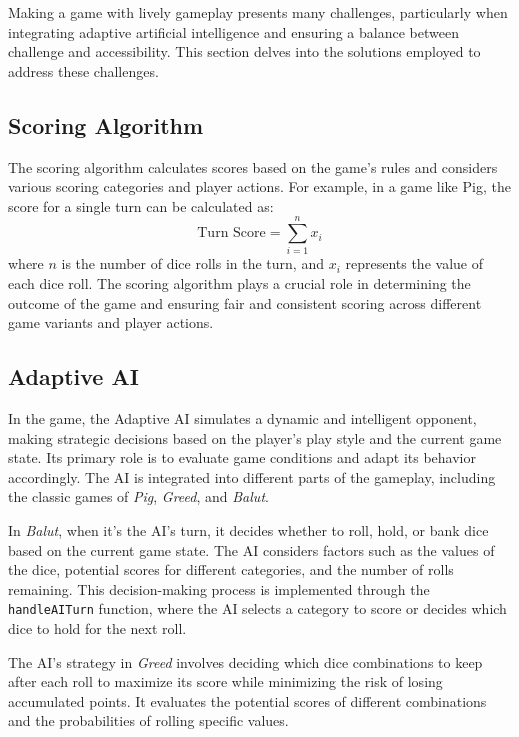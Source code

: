 Making a game with lively gameplay presents many challenges, particularly when integrating adaptive artificial intelligence and ensuring a balance between challenge and accessibility. This section delves into the solutions employed to address these challenges.

\subsection{Scoring Algorithm}

The scoring algorithm calculates scores based on the game's rules and considers various scoring categories and player actions. 
For example, in a game like Pig, the score for a single turn can be calculated as:
\begin{equation}
\text{Turn Score} = \sum_{i=1}^{n} x_i
\end{equation}
where $n$ is the number of dice rolls in the turn, and $x_i$ represents the value of each dice roll.
The scoring algorithm plays a crucial role in determining the outcome of the game and ensuring fair and consistent scoring across different game variants and player actions.

\subsection{Adaptive AI}
\label{subsec:adaptive_ai}

In the game, the Adaptive AI simulates a dynamic and intelligent opponent, making strategic decisions based on the player's play style and the current game state.  Its primary role is to evaluate game conditions and adapt its behavior accordingly. The AI is integrated into different parts of the gameplay, including the classic games of \emph{Pig}, \emph{Greed}, and \emph{Balut}.

In \emph{Balut}, when it's the AI's turn, it decides whether to roll, hold, or bank dice based on the current game state.  The AI considers factors such as the values of the dice, potential scores for different categories, and the number of rolls remaining.  This decision-making process is implemented through the \texttt{handleAITurn} function, where the AI selects a category to score or decides which dice to hold for the next roll.

The AI's strategy in \emph{Greed} involves deciding which dice combinations to keep after each roll to maximize its score while minimizing the risk of losing accumulated points.  It evaluates the potential scores of different combinations and the probabilities of rolling specific values.

